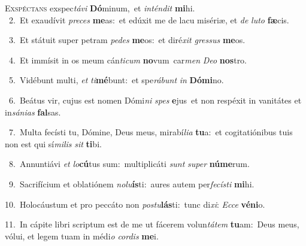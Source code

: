 \lettrine{\initial\textcolor{\initialcolor}{E}}{xspéctans} exspec\-\textit{tá}\-\textit{vi} \textbf{Dó}\-minum,~\star et \textit{in}\-\textit{tén}\textit{dit} \textbf{mi}\-hi.\\
{\numbfont\textcolor{\numbcolor}{~2.}}~Et exaudívit \textit{pre}\-\textit{ces} \textbf{me}\-as:~\star et edúxit me de lacu misériæ, et \textit{de} \textit{lu}\-\textit{to} \textbf{fæ}\-cis.\par
{\numbfont\textcolor{\numbcolor}{~3.}}~Et státuit super petram \textit{pe}\-\textit{des} \textbf{me}\-os:~\star et diré\textit{xit} \textit{gres}\-\textit{sus} \textbf{me}\-os.\par
{\numbfont\textcolor{\numbcolor}{~4.}}~Et immísit in os meum cán\-\textit{ti}\-\textit{cum} \textbf{no}\-vum~\star car\textit{men} \textit{De}\-\textit{o} \textbf{nos}\-tro.\par
{\numbfont\textcolor{\numbcolor}{~5.}}~Vidébunt multi, \textit{et} \textit{ti}\-\textbf{mé}bunt:~\star et spe\-\textit{rá}\-\textit{bunt} \textit{in} \textbf{Dó}\-\textbf{mi}no.\par
{\numbfont\textcolor{\numbcolor}{~6.}}~Beátus vir, cujus est nomen Dómi\textit{ni} \textit{spes} \textbf{e}\-jus~\star et non respéxit in vanitátes et in\-\textit{sá}\-\textit{ni}\textit{as} \textbf{fal}\-sas.\par
{\numbfont\textcolor{\numbcolor}{~7.}}~Multa fecísti tu, Dómine, Deus meus, mirabí\-\textit{li}\-\textit{a} \textbf{tu}\-a:~\star et cogitatiónibus tuis non est qui sí\-\textit{mi}\-\textit{lis} \textit{sit} \textbf{ti}\-bi.\par
{\numbfont\textcolor{\numbcolor}{~8.}}~Annuntiávi \textit{et} \textit{lo}\-\textbf{cú}tus sum:~\star multiplicáti \textit{sunt} \textit{su}\-\textit{per} \textbf{nú}\-\textbf{me}rum.\par
{\numbfont\textcolor{\numbcolor}{~9.}}~Sacrifícium et oblatiónem \textit{no}\-\textit{lu}\textbf{ís}ti:~\star aures autem per\-\textit{fe}\-\textit{cís}\textit{ti} \textbf{mi}\-hi.\par
{\numbfont\textcolor{\numbcolor}{10.}}~Holocáustum et pro peccáto non \textit{pos}\-\textit{tu}\textbf{lás}ti:~\star tunc di\-\textit{xi}\-: \textit{Ec}\-\textit{ce} \textbf{vé}\-\textbf{ni}o.\par
{\numbfont\textcolor{\numbcolor}{11.}}~In cápite libri scriptum est de me ut fácerem volun\-\textit{tá}\-\textit{tem} \textbf{tu}\-am:~\star Deus meus, vólui, et legem tuam in médi\textit{o} \textit{cor}\-\textit{dis} \textbf{me}\-i.\par

